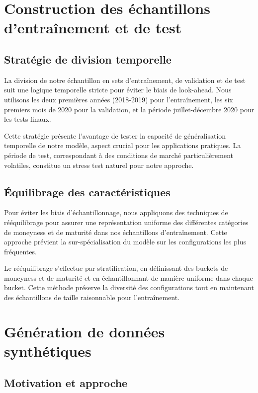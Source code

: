 \section{Construction des échantillons d'entraînement et de test}

\subsection{Stratégie de division temporelle}

La division de notre échantillon en sets d'entraînement, de validation et de test suit une logique temporelle stricte pour éviter le biais de look-ahead. Nous utilisons les deux premières années (2018-2019) pour l'entraînement, les six premiers mois de 2020 pour la validation, et la période juillet-décembre 2020 pour les tests finaux.

Cette stratégie présente l'avantage de tester la capacité de généralisation temporelle de notre modèle, aspect crucial pour les applications pratiques. La période de test, correspondant à des conditions de marché particulièrement volatiles, constitue un stress test naturel pour notre approche.

\subsection{Équilibrage des caractéristiques}

Pour éviter les biais d'échantillonnage, nous appliquons des techniques de rééquilibrage pour assurer une représentation uniforme des différentes catégories de moneyness et de maturité dans nos échantillons d'entraînement. Cette approche prévient la sur-spécialisation du modèle sur les configurations les plus fréquentes.

Le rééquilibrage s'effectue par stratification, en définissant des buckets de moneyness et de maturité et en échantillonnant de manière uniforme dans chaque bucket. Cette méthode préserve la diversité des configurations tout en maintenant des échantillons de taille raisonnable pour l'entraînement.

\section{Génération de données synthétiques}

\subsection{Motivation et approche}

